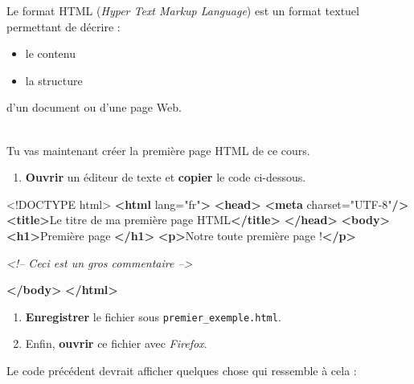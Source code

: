 \documentclass[a4paper,12pt]{article}
\newenvironment{eleve}%
{\begin{activite}\color{noiramu}\\}
{\end{activite}}
\providecommand{\tightlist}{%
      \setlength{\itemsep}{0pt}\setlength{\parskip}{0pt}}
\newenvironment{Shaded}{}{}
\newcommand{\KeywordTok}[1]{\textcolor[rgb]{0.00,0.44,0.13}{\textbf{{#1}}}}
\newcommand{\DataTypeTok}[1]{\textcolor[rgb]{0.56,0.13,0.00}{{#1}}}
\newcommand{\StringTok}[1]{\textcolor[rgb]{0.25,0.44,0.63}{{#1}}}
\newcommand{\CommentTok}[1]{\textcolor[rgb]{0.38,0.63,0.69}{\textit{{#1}}}}
\newcommand{\OtherTok}[1]{\textcolor[rgb]{0.00,0.44,0.13}{{#1}}}
\newcommand{\NormalTok}[1]{{#1}}
\begin{document}
    Le format HTML (\emph{Hyper Text Markup Language}) est un format textuel
permettant de décrire :

\begin{itemize}
\tightlist
\item
  le contenu
\item
  la structure
\end{itemize}

d'un document ou d'une page Web.
\begin{eleve}
    Tu vas maintenant créer la première page HTML de ce cours.

\begin{enumerate}
\def\labelenumi{\arabic{enumi}.}
\tightlist
\item
  \textbf{Ouvrir} un éditeur de texte et \textbf{copier} le code
  ci-dessous.
\end{enumerate}

\begin{Shaded}
\begin{Highlighting}[]
\DataTypeTok{<!DOCTYPE }\NormalTok{html}\DataTypeTok{>}
\KeywordTok{<html}\OtherTok{ lang=}\StringTok{"fr"}\KeywordTok{>}
\KeywordTok{<head>}
    \KeywordTok{<meta}\OtherTok{ charset=}\StringTok{"UTF-8"}\KeywordTok{/>}
    \KeywordTok{<title>}\NormalTok{Le titre de ma première page HTML}\KeywordTok{</title>}
\KeywordTok{</head>}
\KeywordTok{<body>}
    \KeywordTok{<h1>}\NormalTok{Première page }\KeywordTok{</h1>}
    \KeywordTok{<p>}\NormalTok{Notre toute première page !}\KeywordTok{</p>}

    \CommentTok{<!-- Ceci est un gros commentaire -->}
    
\KeywordTok{</body>}
\KeywordTok{</html>}
\end{Highlighting}
\end{Shaded}

\begin{enumerate}
\def\labelenumi{\arabic{enumi}.}
\setcounter{enumi}{1}
\tightlist
\item
  \textbf{Enregistrer} le fichier sous \texttt{premier\_exemple.html}.
\item
  Enfin, \textbf{ouvrir} ce fichier avec \emph{Firefox}.
\end{enumerate}
        
        \end{eleve}\begin{methode}
    Le code précédent devrait afficher quelques chose qui ressemble à cela :


\end{methode}
\end{document}
